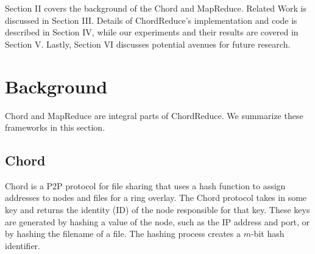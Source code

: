 \documentclass[conference, compsocconf, letterpaper]{IEEEtran}
\begin{document}
Section II covers the background  of the Chord and MapReduce.  Related Work is discussed in Section III. Details of ChordReduce's implementation and code is described in Section IV, while our experiments and their results are covered in Section V.  Lastly, Section VI discusses potential avenues for future research.





\section{Background}
Chord and MapReduce are integral parts of ChordReduce.  We summarize these frameworks in this section.
\subsection{Chord}
Chord \cite{Chord} is a P2P protocol for file sharing that uses a hash function to assign addresses to nodes and files for a ring overlay. The Chord protocol takes in some key and returns the identity (ID) of the node responsible for that key.  These keys are generated by hashing a value of the node, such as the IP address and port, or by hashing the filename of a file.  The hashing process creates a $m$-bit hash identifier.
\end{document}
